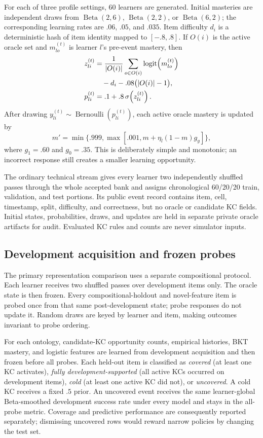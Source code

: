 For each of three profile settings, 60 learners are generated.  Initial
masteries are independent draws from $\operatorname{Beta}(2,6)$,
$\operatorname{Beta}(2,2)$, or $\operatorname{Beta}(6,2)$; the corresponding
learning rates are $.06$, $.05$, and $.035$.  Item difficulty $d_i$ is a
deterministic hash of item identity mapped to $[-.8,.8]$.  If $O(i)$ is the
active oracle set and $m_{lo}^{(t)}$ is learner $l$'s pre-event mastery, then
\begin{align}
 z_{li}^{(t)} &= \frac{1}{|O(i)|}\sum_{o\in O(i)}
   \operatorname{logit}\!\left(m_{lo}^{(t)}\right)\notag\\
   &\quad-d_i-.08\bigl(|O(i)|-1\bigr),\\
 p_{li}^{(t)} &= .1+.8\,\sigma\!\left(z_{li}^{(t)}\right).
\end{align}
After drawing $y_{li}^{(t)}\sim\operatorname{Bernoulli}(p_{li}^{(t)})$, each
active oracle mastery is updated by
\begin{equation}
 m' = \min\{.999,\max[.001,
 m+\eta_l(1-m)g_y]\},
\end{equation}
where $g_1=.60$ and $g_0=.35$.  This is deliberately simple and monotonic; an
incorrect response still creates a smaller learning opportunity.

The ordinary technical stream gives every learner two independently shuffled
passes through the whole accepted bank and assigns chronological 60/20/20
train, validation, and test portions.  Its public event record contains item,
cell, timestamp, split, difficulty, and correctness, but no oracle or candidate
KC fields.  Initial states, probabilities, draws, and updates are held in
separate private oracle artifacts for audit.  Evaluated KC rules and counts are
never simulator inputs.

\subsection{Development acquisition and frozen probes}

The primary representation comparison uses a separate compositional protocol.
Each learner receives two shuffled passes over development items only.  The
oracle state is then frozen.  Every compositional-holdout and novel-feature
item is probed once from that same post-development state; probe responses do
not update it.  Random draws are keyed by learner and item, making outcomes
invariant to probe ordering.

For each ontology, candidate-KC opportunity counts, empirical histories, BKT
mastery, and logistic features are learned from development acquisition and
then frozen before all probes.  Each held-out item is classified as
\emph{covered} (at least one KC activates), \emph{fully development-supported}
(all active KCs occurred on development items), \emph{cold} (at least one
active KC did not), or \emph{uncovered}.  A cold KC receives a fixed $.5$
prior.  An uncovered event receives the same learner-global Beta-smoothed
development success rate under every model and stays in the all-probe metric.
Coverage and predictive performance are consequently reported separately;
dismissing uncovered rows would reward narrow policies by changing the test
set.

